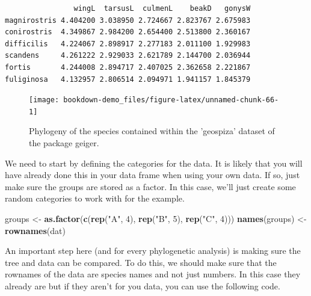 \documentclass[
]{book}
\newenvironment{Shaded}{\begin{snugshade}}{\end{snugshade}}
\newcommand{\CommentTok}[1]{\textcolor[rgb]{0.56,0.35,0.01}{\textit{#1}}}
\newcommand{\DecValTok}[1]{\textcolor[rgb]{0.00,0.00,0.81}{#1}}
\newcommand{\KeywordTok}[1]{\textcolor[rgb]{0.13,0.29,0.53}{\textbf{#1}}}
\newcommand{\NormalTok}[1]{#1}
\newcommand{\OperatorTok}[1]{\textcolor[rgb]{0.81,0.36,0.00}{\textbf{#1}}}
\newcommand{\StringTok}[1]{\textcolor[rgb]{0.31,0.60,0.02}{#1}}
\begin{document}
\begin{verbatim}
                wingL  tarsusL  culmenL    beakD   gonysW
magnirostris 4.404200 3.038950 2.724667 2.823767 2.675983
conirostris  4.349867 2.984200 2.654400 2.513800 2.360167
difficilis   4.224067 2.898917 2.277183 2.011100 1.929983
scandens     4.261222 2.929033 2.621789 2.144700 2.036944
fortis       4.244008 2.894717 2.407025 2.362658 2.221867
fuliginosa   4.132957 2.806514 2.094971 1.941157 1.845379
\end{verbatim}

\begin{figure}[H]

{\centering \texttt{[image: bookdown-demo\_files/figure-latex/unnamed-chunk-66-1]} 

}

\caption{Phylogeny of the species contained within the 'geospiza' dataset of the package geiger.}\label{fig:unnamed-chunk-66}
\end{figure}

We need to start by defining the categories for the data. It is likely that you will have already done this in your data frame when using your own data. If so, just make sure the groups are stored as a factor. In this case, we'll just create some random categories to work with for the example.

\begin{Shaded}
\begin{Highlighting}[]
\NormalTok{groups \textless{}{-}}\StringTok{ }\KeywordTok{as.factor}\NormalTok{(}\KeywordTok{c}\NormalTok{(}\KeywordTok{rep}\NormalTok{(}\StringTok{"A"}\NormalTok{, }\DecValTok{4}\NormalTok{), }\KeywordTok{rep}\NormalTok{(}\StringTok{"B"}\NormalTok{, }\DecValTok{5}\NormalTok{), }\KeywordTok{rep}\NormalTok{(}\StringTok{"C"}\NormalTok{, }\DecValTok{4}\NormalTok{)))}
\KeywordTok{names}\NormalTok{(groups) \textless{}{-}}\StringTok{ }\KeywordTok{rownames}\NormalTok{(dat)}
\end{Highlighting}
\end{Shaded}

An important step here (and for every phylogenetic analysis) is making sure the tree and data can be compared. To do this, we should make sure that the rownames of the data are species names and not just numbers. In this case they already are but if they aren't for you data, you can use the following code.

\begin{Shaded}
\end{Shaded}
\end{document}
